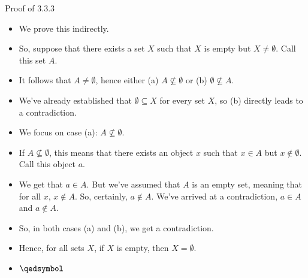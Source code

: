\begin{frame}{Proof of 3.3.3}

	\begin{itemize}

		\item We prove this indirectly. 
		
		\item So, suppose that there exists a set $X$ such that $X$ is empty but $X\neq\emptyset$.  Call this set $A$.
		
		\item It follows that $A\neq \emptyset$, hence either (a) $A\nsubseteq \emptyset$ or (b) $\emptyset\nsubseteq A$. 
		
		\item We've already established that $\emptyset\subseteq X$ for every set $X$, so (b) directly leads to a contradiction.
		
		\item We focus on case (a): $A\nsubseteq \emptyset$.
		
		\item If $A\nsubseteq \emptyset$, this means that there exists an object $x$ such that $x\in A$ but $x\notin \emptyset$. Call this object $a$. 
		
		\item We get that $a\in A$. But we've assumed that $A$ is an empty set, meaning that for all $x$, $x\notin A$. So, certainly, $a\notin A$. We've arrived at a contradiction, $a\in A$ and $a\notin A$.
		
		\item So, in both cases (a) and (b), we get a contradiction. 
		
		\item Hence, for all sets $X$, if $X$ is empty, then $X=\emptyset$.
		
		\item $\qedsymbol$
		
		\end{itemize}

\end{frame}


